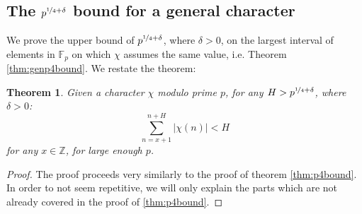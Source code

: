 \documentclass{report}
\newtheorem*{theorem*}{Theorem}
\begin{document}
\subsection{The $p^{\nicefrac{1}{4}+\delta}$ bound for a general character}
We prove the upper bound of $p^{\nicefrac{1}{4}+\delta}$, where $\delta>0$, on the largest interval of elements in $\mathbb{F}_p$ on which $\chi$ assumes the same value, i.e. Theorem \ref{thm:genp4bound}. We restate the theorem:
\begin{theorem*}
Given a character $\chi$ modulo prime $p$, for any $H>p^{\nicefrac{1}{4}+\delta}$, where $\delta>0$:
\[\sum\limits_{n=x+1}^{n+H}\lvert\chi(n)\rvert<H\]
for any $x\in\mathbb{Z}$, for large enough $p$.
\end{theorem*}
\begin{proof}
The proof proceeds very similarly to the proof of theorem \ref{thm:p4bound}. In order to not seem repetitive, we will only explain the parts which are not already covered in the proof of \ref{thm:p4bound}.


\end{proof}
\end{document}
